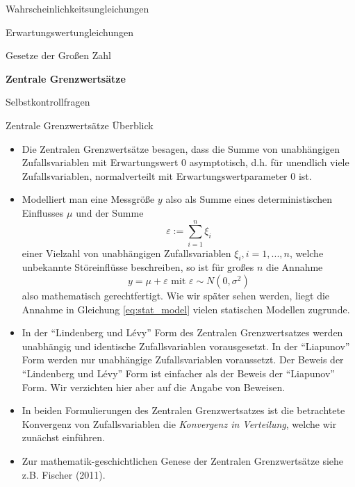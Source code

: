 \documentclass[
  8pt,
  ignorenonframetext,
]{beamer}
\providecommand{\tightlist}{%
  \setlength{\itemsep}{0pt}\setlength{\parskip}{0pt}}
\begin{document}
\begin{frame}{}
\protect\hypertarget{section-6}{}
\large
\vfill
{}

Wahrscheinlichkeitsungleichungen

Erwartungswertungleichungen

Gesetze der Großen Zahl

\textbf{Zentrale Grenzwertsätze}

Selbstkontrollfragen \vfill
\end{frame}

\begin{frame}{Zentrale Grenzwertsätze}
\protect\hypertarget{zentrale-grenzwertsuxe4tze}{}
Überblick \footnotesize

\begin{itemize}
\tightlist
\item
  \justifying Die Zentralen Grenzwertsätze besagen, dass die Summe von
  unabhängigen Zufallsvariablen mit Erwartungswert 0 asymptotisch, d.h.
  für unendlich viele Zufallsvariablen, normalverteilt mit
  Erwartungswertparameter 0 ist.
\item
  Modelliert man eine Messgröße \(y\) also als Summe eines
  deterministischen Einflusses \(\mu\) und der Summe \begin{equation}
  \varepsilon := \sum_{i=1}^n \xi_i
  \end{equation} einer Vielzahl von unabhängigen Zufallsvariablen
  \(\xi_i, i = 1,...,n\), welche unbekannte Störeinflüsse beschreiben,
  so ist für großes \(n\) die Annahme
  \begin{equation}\label{eq:stat_model}
  y = \mu + \varepsilon \mbox{ mit } \varepsilon \sim N(0,\sigma^2)
  \end{equation} also mathematisch gerechtfertigt. Wie wir später sehen
  werden, liegt die Annahme in Gleichung \eqref{eq:stat_model} vielen
  statischen Modellen zugrunde.
\item
  In der ``Lindenberg und Lévy'' Form des Zentralen Grenzwertsatzes
  werden unabhängig und identische Zufallsvariablen vorausgesetzt. In
  der ``Liapunov'' Form werden nur unabhängige Zufallsvariablen
  voraussetzt. Der Beweis der ``Lindenberg und Lévy'' Form ist einfacher
  als der Beweis der ``Liapunov'' Form. Wir verzichten hier aber auf die
  Angabe von Beweisen.
\item
  In beiden Formulierungen des Zentralen Grenzwertsatzes ist die
  betrachtete Konvergenz von Zufallsvariablen die \emph{Konvergenz in
  Verteilung}, welche wir zunächst einführen.
\item
  Zur mathematik-geschichtlichen Genese der Zentralen Grenzwertsätze
  siehe z.B. Fischer (2011).
\end{itemize}
\end{frame}
\end{document}
